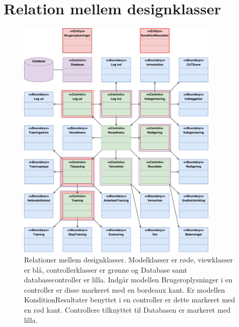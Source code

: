 \chapter{Relation mellem designklasser} \label{bilagA}

\begin{figure} [H]
\centering
\includegraphics[width=0.85\textwidth]{figures/MVC/Designklasse}
\caption{Relationer mellem designklasser. Modelklasser er røde, viewklasser er blå, controllerklasser er grønne og Database samt databasecontroller er lilla. Indgår modellen Brugeroplysninger i en controller er disse markeret med en bordeaux kant. Er modellen KonditionResultater benyttet i en controller er dette markeret med en rød kant. Controllere tilknyttet til Databasen er markeret med lilla. }
\label{fig:Designklasser}
\end{figure}